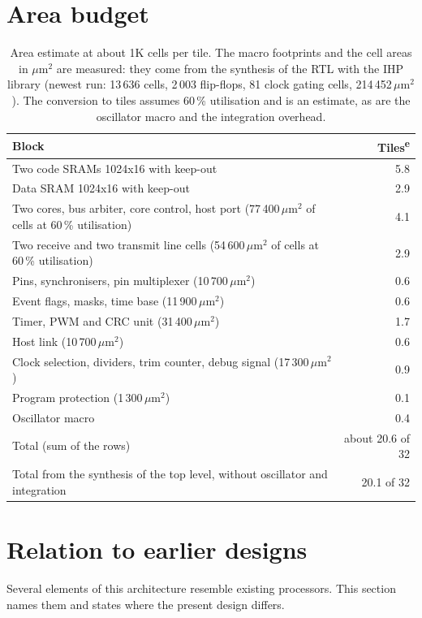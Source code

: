 \documentclass[10pt,a4paper]{article}
\newcommand{\est}{\textsuperscript{e}}
\begin{document}
\section{Area budget}

\begin{table}[!htb]
\centering\small
\begin{tabular}{@{}lr@{}}
\toprule
Block & Tiles\est \\
\midrule
Two code SRAMs 1024x16 with keep-out & 5.8 \\
Data SRAM 1024x16 with keep-out & 2.9 \\
Two cores, bus arbiter, core control, host port (77\,400\,$\mu$m$^2$ of cells at 60\,\% utilisation) & 4.1 \\
Two receive and two transmit line cells (54\,600\,$\mu$m$^2$ of cells at 60\,\% utilisation) & 2.9 \\
Pins, synchronisers, pin multiplexer (10\,700\,$\mu$m$^2$) & 0.6 \\
Event flags, masks, time base (11\,900\,$\mu$m$^2$) & 0.6 \\
Timer, PWM and CRC unit (31\,400\,$\mu$m$^2$) & 1.7 \\
Host link (10\,700\,$\mu$m$^2$) & 0.6 \\
Clock selection, dividers, trim counter, debug signal (17\,300\,$\mu$m$^2$) & 0.9 \\
Program protection (1\,300\,$\mu$m$^2$) & 0.1 \\
Oscillator macro & 0.4 \\
\midrule
Total (sum of the rows) & about 20.6 of 32 \\
Total from the synthesis of the top level, without oscillator and integration & 20.1 of 32 \\
\bottomrule
\end{tabular}
\caption{Area estimate at about 1K cells per tile. The macro footprints and the cell areas in $\mu$m$^2$ are measured: they come from the synthesis of the RTL with the IHP library (newest run: 13\,636 cells, 2\,003 flip-flops, 81 clock gating cells, 214\,452\,$\mu$m$^2$). The conversion to tiles assumes 60\,\% utilisation and is an estimate, as are the oscillator macro and the integration overhead.}
\end{table}

\section{Relation to earlier designs}

Several elements of this architecture resemble existing processors. This section names them and states where
the present design differs.
\end{document}
